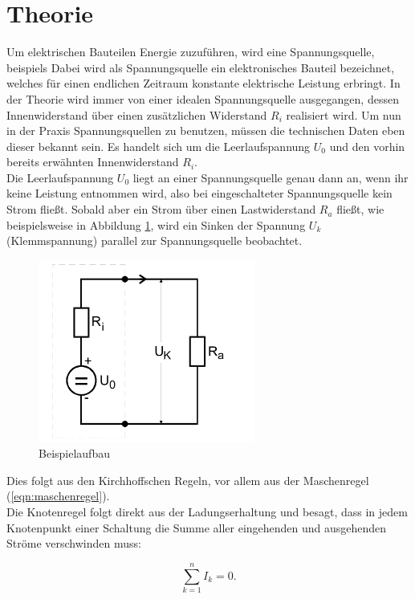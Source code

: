 \section{Theorie}
\label{sec:Theorie}
Um elektrischen Bauteilen Energie zuzuführen, wird eine Spannungsquelle, beispiels
Dabei wird als Spannungsquelle ein elektronisches Bauteil bezeichnet, welches für einen endlichen Zeitraum konstante elektrische Leistung erbringt.
In der Theorie wird immer von einer idealen Spannungsquelle ausgegangen, dessen Innenwiderstand über einen zusätzlichen Widerstand $R_i$ realisiert wird.
Um nun in der Praxis Spannungsquellen zu benutzen, müssen die technischen Daten eben dieser bekannt sein.
Es handelt sich um die Leerlaufspannung $U_0$ und den vorhin bereits erwähnten Innenwiderstand $R_i$.\\
Die Leerlaufspannung $U_0$ liegt an einer Spannungsquelle genau dann an, wenn ihr keine Leistung entnommen wird, also bei eingeschalteter Spannungsquelle kein Strom fließt.
Sobald aber ein Strom über einen Lastwiderstand $R_a$ fließt, wie beispielsweise in Abbildung \ref{fig:t1}, wird ein Sinken der Spannung $U_k$ (Klemmspannung) parallel zur Spannungsquelle beobachtet.

\begin{figure}[H]
  \centering
  \includegraphics[height=6cm]{innenwiderstand.png}
  \caption{Beispielaufbau \cite{sample}}
  \label{fig:t1}
\end{figure}

Dies folgt aus den Kirchhoffschen Regeln, vor allem aus der Maschenregel (\ref{eqn:maschenregel}).\\
Die Knotenregel folgt direkt aus der Ladungserhaltung und besagt, dass in jedem Knotenpunkt einer Schaltung die Summe aller eingehenden und ausgehenden Ströme verschwinden muss:

\begin{equation}
  \sum_{k=1}^n I_k = 0.
  \label{eqn:knotenregel}
\end{equation}

